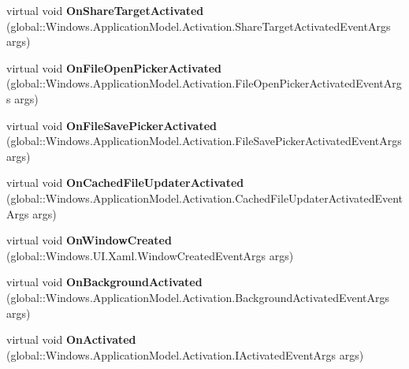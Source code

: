 \begin{DoxyCompactItemize}
\item 
\mbox{\label{class_windows_1_1_u_i_1_1_xaml_1_1_application_a9281a10e995bfc3ce84c4732cd139856}} 
virtual void {\bfseries On\+Share\+Target\+Activated} (global\+::\+Windows.\+Application\+Model.\+Activation.\+Share\+Target\+Activated\+Event\+Args args)
\item 
\mbox{\label{class_windows_1_1_u_i_1_1_xaml_1_1_application_a6349d39f9b31d3d870acad8ce929f8cb}} 
virtual void {\bfseries On\+File\+Open\+Picker\+Activated} (global\+::\+Windows.\+Application\+Model.\+Activation.\+File\+Open\+Picker\+Activated\+Event\+Args args)
\item 
\mbox{\label{class_windows_1_1_u_i_1_1_xaml_1_1_application_ac08cc52e93ef57a27360f3cb1ae256c4}} 
virtual void {\bfseries On\+File\+Save\+Picker\+Activated} (global\+::\+Windows.\+Application\+Model.\+Activation.\+File\+Save\+Picker\+Activated\+Event\+Args args)
\item 
\mbox{\label{class_windows_1_1_u_i_1_1_xaml_1_1_application_a7f572e2107540b33cb772a84ddd7ec72}} 
virtual void {\bfseries On\+Cached\+File\+Updater\+Activated} (global\+::\+Windows.\+Application\+Model.\+Activation.\+Cached\+File\+Updater\+Activated\+Event\+Args args)
\item 
\mbox{\label{class_windows_1_1_u_i_1_1_xaml_1_1_application_a69d851136f5764f6fb1d953b4447219f}} 
virtual void {\bfseries On\+Window\+Created} (global\+::\+Windows.\+U\+I.\+Xaml.\+Window\+Created\+Event\+Args args)
\item 
\mbox{\label{class_windows_1_1_u_i_1_1_xaml_1_1_application_a99448e12dcdd4516781f0aba248db35e}} 
virtual void {\bfseries On\+Background\+Activated} (global\+::\+Windows.\+Application\+Model.\+Activation.\+Background\+Activated\+Event\+Args args)
\item 
\mbox{\label{class_windows_1_1_u_i_1_1_xaml_1_1_application_a1007269442b51bcb8b6f72fb5c538c4d}} 
virtual void {\bfseries On\+Activated} (global\+::\+Windows.\+Application\+Model.\+Activation.\+I\+Activated\+Event\+Args args)

\end{DoxyCompactItemize}
